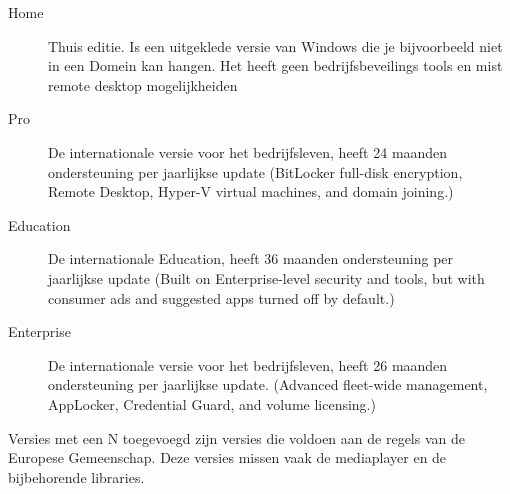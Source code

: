 \begin{description}
\item[Home] Thuis editie. Is een uitgeklede versie van Windows die je bijvoorbeeld niet in een Domein kan hangen. Het heeft geen bedrijfsbeveilings tools en mist remote desktop mogelijkheiden
\item[Pro] De internationale  versie voor het bedrijfsleven, heeft 24 maanden ondersteuning per jaarlijkse update (BitLocker full-disk encryption, Remote Desktop, Hyper-V virtual machines, and domain joining.)
\item[Education] De internationale Education, heeft 36 maanden ondersteuning per jaarlijkse update (Built on Enterprise-level security and tools, but with consumer ads and suggested apps turned off by default.)
\item[Enterprise] De internationale  versie voor het bedrijfsleven, heeft 26 maanden ondersteuning per jaarlijkse update. (Advanced fleet-wide management, AppLocker, Credential Guard, and volume licensing.)
\end{description}

Versies met een N toegevoegd zijn versies die voldoen aan de regels van de Europese Gemeenschap. Deze versies missen vaak de mediaplayer en de bijbehorende libraries.


